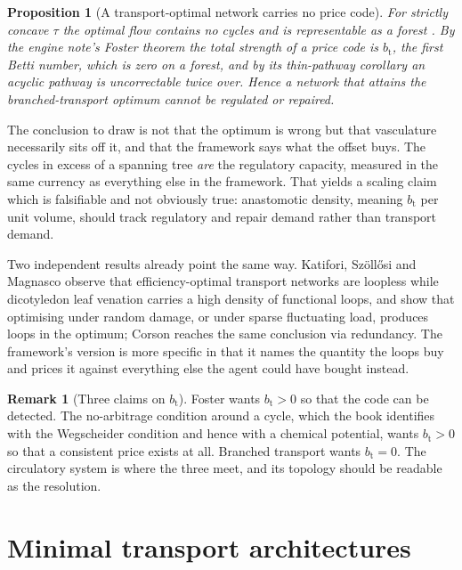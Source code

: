 \documentclass[11pt]{article}
\theoremstyle{plain}
\newtheorem{proposition}[theorem]{Proposition}
\theoremstyle{definition}
\newtheorem{remark}[theorem]{Remark}
\newcommand{\bt}{b_{\mathrm{t}}}
\begin{document}
\begin{proposition}[A transport-optimal network carries no price code]
\label{prop:O}
For strictly concave $\tau$ the optimal flow contains no cycles and is representable as a forest
\cite[Prop.~7.8]{bcm2009}. By the engine note's Foster theorem the total strength of a price code is
$\bt$, the first Betti number, which is zero on a forest, and by its thin-pathway corollary an
acyclic pathway is uncorrectable twice over. Hence a network that attains the branched-transport
optimum cannot be regulated or repaired.
\end{proposition}

The conclusion to draw is not that the optimum is wrong but that vasculature necessarily sits off it,
and that the framework says what the offset buys. The cycles in excess of a spanning tree
\emph{are} the regulatory capacity, measured in the same currency as everything else in the
framework. That yields a scaling claim which is falsifiable and not obviously true: anastomotic
density, meaning $\bt$ per unit volume, should track regulatory and repair demand rather than
transport demand.

Two independent results already point the same way. Katifori, Sz\"oll\H{o}si and Magnasco
\cite{katifori2010} observe that efficiency-optimal transport networks are loopless while dicotyledon
leaf venation carries a high density of functional loops, and show that optimising under random
damage, or under sparse fluctuating load, produces loops in the optimum; Corson \cite{corson2010}
reaches the same conclusion via redundancy. The framework's version is more specific in that it names
the quantity the loops buy and prices it against everything else the agent could have bought instead.

\begin{remark}[Three claims on $\bt$]
\label{rem:three}
Foster wants $\bt > 0$ so that the code can be detected. The no-arbitrage condition around a cycle,
which the book identifies with the Wegscheider condition and hence with a chemical potential, wants
$\bt > 0$ so that a consistent price exists at all. Branched transport wants $\bt = 0$. The
circulatory system is where the three meet, and its topology should be readable as the resolution.
\end{remark}

\section{Minimal transport architectures}
\label{sec:ladder}
\end{document}
